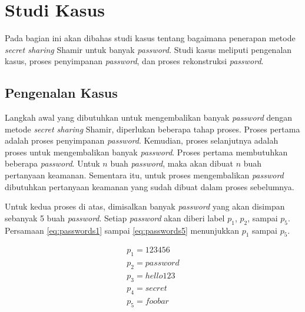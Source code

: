\section{Studi Kasus}

Pada bagian ini akan dibahas studi kasus tentang bagaimana penerapan metode \textit{secret sharing} Shamir untuk banyak \textit{password}. Studi kasus meliputi pengenalan kasus, proses penyimpanan \textit{password}, dan proses rekonstruksi \textit{password}.

\subsection{Pengenalan Kasus}\label{subsec:pengenalankasus}

Langkah awal yang dibutuhkan untuk mengembalikan banyak \textit{password} dengan metode \textit{secret sharing} Shamir, diperlukan beberapa tahap proses. Proses pertama adalah proses penyimpanan \textit{password}. Kemudian, proses selanjutnya adalah proses untuk mengembalikan banyak \textit{password}. Proses pertama membutuhkan beberapa \textit{password}. Untuk \begin{math}n\end{math} buah \textit{password}, maka akan dibuat \begin{math}n\end{math} buah pertanyaan keamanan. Sementara itu, untuk proses mengembalikan \textit{password} dibutuhkan pertanyaan keamanan yang sudah dibuat dalam proses sebelumnya.

Untuk kedua proses di atas, dimisalkan banyak \textit{password} yang akan disimpan sebanyak 5 buah \textit{password}. Setiap \textit{password} akan diberi label \begin{math}p_1\end{math}, \begin{math}p_2\end{math}, sampai \begin{math}p_5\end{math}. Persamaan \ref{eq:passwords1} sampai \ref{eq:passwords5} menunjukkan \begin{math}p_1\end{math} sampai \begin{math}p_5\end{math}.

\begin{gather}
	p_1 = 123456 \label{eq:passwords1} \\
	p_2 = password \label{eq:passwords2} \\
	p_3 = hello123 \label{eq:passwords3} \\
	p_4 = secret \label{eq:passwords4} \\
	p_5 = foobar \label{eq:passwords5}
\end{gather}

